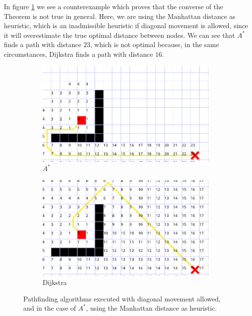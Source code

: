 \documentclass[12pt]{report}
\begin{document}
In figure \ref{fig:counterexample:admissible} we see a counterexample which proves that the converse of the Theorem is not true in general. Here, we are using the Manhattan distance as heuristic, which is an inadmissible heuristic if diagonal movement is allowed, since it will overestimate the true optimal distance between nodes. We can see that $A^*$ finds a path with distance $23$, which is not optimal because, in the same circumstances, Dijkstra finds a path with distance $16$.

\begin{figure}
\centering
\begin{subfigure}[b]{0.65\textwidth}
	\includegraphics[width=1\linewidth]{astar-fail}
	\caption{$A^*$}
\end{subfigure}
\begin{subfigure}[b]{0.65\textwidth}
	\includegraphics[width=1\linewidth]{astar-fail-dijkstra}
	\caption{Dijkstra}
\end{subfigure}
\caption{Pathfinding algorithms executed with diagonal movement allowed, and in the case of $A^*$, using the Manhattan distance as heuristic.}
\label{fig:counterexample:admissible}
\end{figure}
\end{document}
